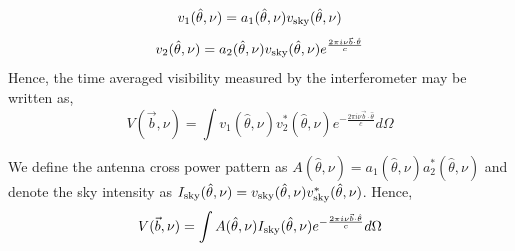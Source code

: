 \documentclass[twocolumn]{emulateapj}
\newcommand{\volt}{{v}}
\newcommand{\vis}{{V}}
\newcommand{\sky}{{\rm sky}}
\newcommand{\bmvolt}{{a}}
\newcommand{\beam}{{A}}
\newcommand{\thhat}{{\hat\theta}}
\newcommand{\fngexp}{{e^{\frac{2\pi i\nu\vec{b}\cdot\thhat}{c}}}}
\newcommand{\ifngexp}{{e^{-\frac{2\pi i\nu\vec{b}\cdot\thhat}{c}}}}
\begin{document}
\begin{equation}
\volt_{1}(\thhat, \nu) = \bmvolt_{1}(\thhat,\nu)\volt_\sky(\thhat,\nu)\nonumber\\
\end{equation}
\begin{equation}
\volt_{2} (\thhat, \nu)= \bmvolt_{2}(\thhat,\nu)\volt_\sky(\thhat,\nu)\fngexp\nonumber\\
\end{equation}
Hence, the time averaged visibility measured by the interferometer may be written as, 
\begin{equation}
\vis(\vec b, \nu) =  \int  \volt_{1}(\thhat,\nu)  \volt_{2}^{*} (\thhat, \nu) \ifngexp d\Omega 
\label{eq1}
\end{equation}

We define the antenna cross power pattern as  $\beam(\thhat,\nu)=\bmvolt_{1}(\thhat,\nu)\bmvolt_{2}^{*}(\thhat,\nu)$ and denote the sky intensity as  $I_\sky(\thhat,\nu)=\volt_\sky(\thhat,\nu)\volt_\sky^{*}(\thhat,\nu)$. Hence, 
\begin{equation}
\vis(\vec b,\nu) = \int \beam(\thhat, \nu) I_\sky(\thhat,\nu) \ifngexp d\Omega
\label{eq2}
\end{equation}
\end{document}
